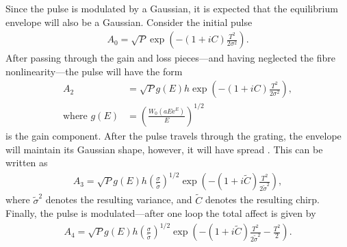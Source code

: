 \documentclass[%
 aps,
 jmp,%
 amsmath,amssymb,
 reprint,%
nofootinbib
]{revtex4-1}
\begin{document}
Since the pulse is modulated by a Gaussian, it is expected that the equilibrium envelope will also be a Gaussian. Consider the initial pulse
\begin{align*}
	A_0 = \sqrt{P} \exp \left( -(1 + iC) \frac{T^2}{2 \sigma^2} \right).
\end{align*}
After passing through the gain and loss pieces---and having neglected the fibre nonlinearity---the pulse will have the form
\begin{align*}
	A_2 &= \sqrt{P} g(E) h \exp \left( -(1 + iC) \frac{T^2}{2 \sigma^2} \right), \\
	\text{where } g(E) &= \left( \frac{W_0(a E \textrm{e}^E)}{E} \right)^{1/2}
\end{align*}
is the gain component. After the pulse travels through the grating, the envelope will maintain its Gaussian shape, however, it will have spread \cite{agrawal2013}. This can be written as
\begin{align}
\label{linear1}
	A_3 = \sqrt{P} g(E) h \left( \frac{\sigma}{\widetilde{\sigma}} \right)^{1/2} \exp \left( -(1 + i \widetilde{C}) \frac{T^2}{2 \widetilde{\sigma}^2} \right),
\end{align}
where $\widetilde{\sigma}^2$ denotes the resulting variance, and $\widetilde{C}$ denotes the resulting chirp. Finally, the pulse is modulated---after one loop the total affect is given by
\begin{align}
\label{linear2}
	A_4 = \sqrt{P} g(E) h \left( \frac{\sigma}{\widetilde{\sigma}} \right)^{1/2} \exp \left( -(1 + i \widetilde{C}) \frac{T^2}{2 \widetilde{\sigma}^2} - \frac{T^2}{2} \right).
\end{align}
\end{document}
